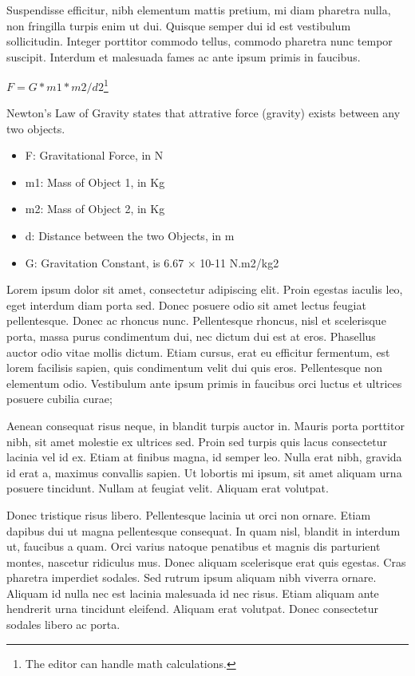 \documentclass{article}
\begin{document}
Suspendisse efficitur, nibh elementum mattis pretium, mi diam pharetra nulla, non fringilla turpis enim ut dui. Quisque semper dui id est vestibulum sollicitudin. Integer porttitor commodo tellus, commodo pharetra nunc tempor suscipit. Interdum et malesuada fames ac ante ipsum primis in faucibus.  


$F = G * m1 * m2 / d2$\footnote{The editor can handle math calculations.}


Newton's Law of Gravity states that attrative force (gravity) exists between any two objects.

\begin{itemize}
\item F: Gravitational Force, in N


\item m1: Mass of Object 1, in Kg


\item m2: Mass of Object 2, in Kg


\item d: Distance between the two Objects, in m


\item G: Gravitation Constant, is 6.67 × 10-11 N.m2/kg2


\end{itemize}

Lorem ipsum dolor sit amet, consectetur adipiscing elit. Proin egestas iaculis leo, eget interdum diam porta sed. Donec posuere odio sit amet lectus feugiat pellentesque. Donec ac rhoncus nunc. Pellentesque rhoncus, nisl et scelerisque porta, massa purus condimentum dui, nec dictum dui est at eros. Phasellus auctor odio vitae mollis dictum. Etiam cursus, erat eu efficitur fermentum, est lorem facilisis sapien, quis condimentum velit dui quis eros. Pellentesque non elementum odio. Vestibulum ante ipsum primis in faucibus orci luctus et ultrices posuere cubilia curae;


Aenean consequat risus neque, in blandit turpis auctor in. Mauris porta porttitor nibh, sit amet molestie ex ultrices sed. Proin sed turpis quis lacus consectetur lacinia vel id ex. Etiam at finibus magna, id semper leo. Nulla erat nibh, gravida id erat a, maximus convallis sapien. Ut lobortis mi ipsum, sit amet aliquam urna posuere tincidunt. Nullam at feugiat velit. Aliquam erat volutpat.


Donec tristique risus libero. Pellentesque lacinia ut orci non ornare. Etiam dapibus dui ut magna pellentesque consequat. In quam nisl, blandit in interdum ut, faucibus a quam. Orci varius natoque penatibus et magnis dis parturient montes, nascetur ridiculus mus. Donec aliquam scelerisque erat quis egestas. Cras pharetra imperdiet sodales. Sed rutrum ipsum aliquam nibh viverra ornare. Aliquam id nulla nec est lacinia malesuada id nec risus. Etiam aliquam ante hendrerit urna tincidunt eleifend. Aliquam erat volutpat. Donec consectetur sodales libero ac porta.
\end{document}
